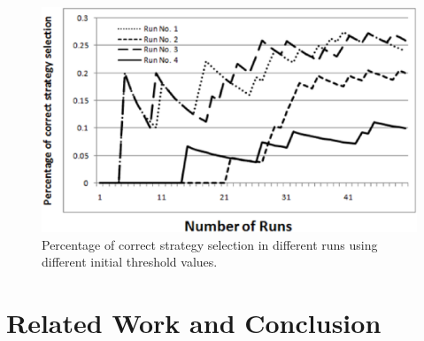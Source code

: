 \documentclass[runningheads,a4paper]{llncs}
\begin{document}
\begin{figure}%
\centering
\includegraphics[scale=0.33]{graph3Final+.eps}
\caption{Percentage of correct strategy selection in different
runs using different initial threshold values.} \label{Graph3}
\end{figure}



\section{Related Work and Conclusion}\label{Conclusion}
\end{document}

